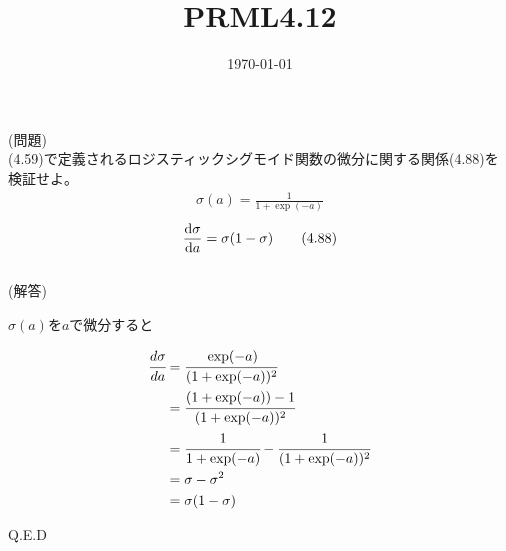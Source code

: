\documentclass{jsarticle}
\title{PRML4.12}
\date{\today}
\begin{document}
\maketitle

(問題)\\
(4.59)で定義されるロジスティックシグモイド関数の微分に関する関係(4.88)を検証せよ。
\begin{align*}
    \sigma(a)=\frac{1}{1+\exp(-a)}\tag{4.59}
    \end{align*}
\begin{align*}
    \frac{{\rm d}\sigma}{{\rm d}a}=\sigma(1-\sigma)\tag{4.88}
\end{align*}
\\
(解答)

$\sigma(a)$を$a$で微分すると

\begin{align*}
    \cfrac{d \sigma}{da}
    &= \cfrac{\exp(-a)}{(1 + \exp(-a))^2} \\
    &= \cfrac{(1 + \exp(-a)) - 1}{(1 + \exp(-a))^2} \\
    &= \cfrac{1}{1 + \exp(-a)} - \cfrac{1}{(1 + \exp(-a))^2} \\
    &= \sigma - \sigma^2 \\
    &= \sigma (1 - \sigma)
\end{align*}

Q.E.D
\end{document}
